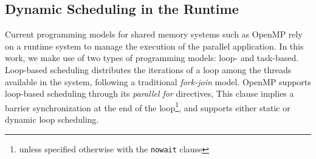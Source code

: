 


\subsection{Dynamic Scheduling in the Runtime}


Current programming models for shared memory systems such as OpenMP rely on a 
runtime system to manage the execution of the parallel application. 
In this work, we make use of two types of programming models: loop- and task-based.
Loop-based scheduling distributes the iterations of a loop among the 
threads available in the system, following a traditional \textit{fork-join} model.
OpenMP supports loop-based scheduling through its \emph{parallel for} directives, 
This clause implies a barrier synchronization at the end of the loop\footnote{unless 
specified otherwise with the \texttt{nowait} clause}, and supports either static or dynamic loop 
scheduling. 

